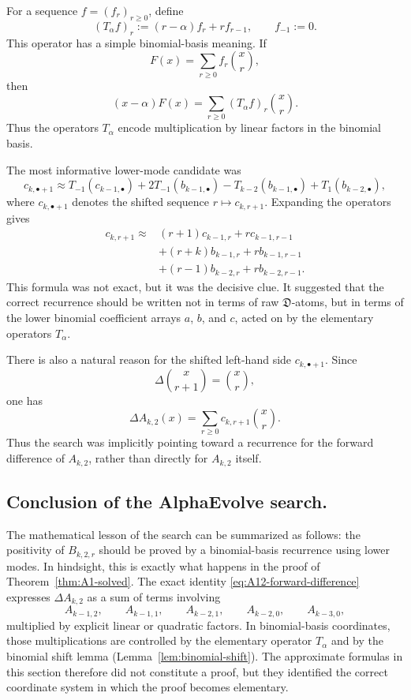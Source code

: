 \documentclass[11pt]{amsart}
\numberwithin{equation}{section}
\theoremstyle{remark}
\newcommand{\Dder}{\mathfrak D}
\begin{document}
For a sequence $f=(f_r)_{r\ge0}$, define
\[
  (T_\alpha f)_r:=(r-\alpha)f_r+r f_{r-1},
  \qquad f_{-1}:=0.
\]
This operator has a simple binomial-basis meaning.  If
\[
  F(x)=\sum_{r\ge0}f_r\binom{x}{r},
\]
then
\[
  (x-\alpha)F(x)
  =
  \sum_{r\ge0}(T_\alpha f)_r\binom{x}{r}.
\]
Thus the operators $T_\alpha$ encode multiplication by linear factors in
the binomial basis.

The most informative lower-mode candidate was
\begin{equation}\label{eq:operator-library-merged}
  c_{k,\bullet+1}
  \approx
  T_{-1}(c_{k-1,\bullet})
  +2T_{-1}(b_{k-1,\bullet})
  -T_{k-2}(b_{k-1,\bullet})
  +T_1(b_{k-2,\bullet}),
\end{equation}
where $c_{k,\bullet+1}$ denotes the shifted sequence
$r\mapsto c_{k,r+1}$.  Expanding the operators gives
\begin{equation}\label{eq:operator-library-expanded-merged}
\begin{aligned}
c_{k,r+1}\approx{}&
(r+1)c_{k-1,r}
+r c_{k-1,r-1}  \\
&+(r+k)b_{k-1,r}
+r b_{k-1,r-1}  \\
&+(r-1)b_{k-2,r}
+r b_{k-2,r-1}.
\end{aligned}
\end{equation}
This formula was not exact, but it was the decisive clue.  It suggested
that the correct recurrence should be written not in terms of raw
$\Dder$-atoms, but in terms of the lower binomial coefficient arrays
$a$, $b$, and $c$, acted on by the elementary operators $T_\alpha$.

There is also a natural reason for the shifted left-hand side
$c_{k,\bullet+1}$.  Since
\[
  \Delta\binom{x}{r+1}=\binom{x}{r},
\]
one has
\[
  \Delta A_{k,2}(x)
  =
  \sum_{r\ge0} c_{k,r+1}\binom{x}{r}.
\]
Thus the search was implicitly pointing toward a recurrence for the forward
difference of $A_{k,2}$, rather than directly for $A_{k,2}$ itself.

\subsection{Conclusion of the AlphaEvolve search.}
The mathematical lesson of the search can be summarized as follows: the positivity of $B_{k,2,r}$ should be proved by a binomial-basis recurrence using lower modes.
In hindsight, this is exactly what happens in the proof of Theorem~\ref{thm:A1-solved}.  The exact identity
\eqref{eq:A12-forward-difference} expresses $\Delta A_{k,2}$ as a sum of
terms involving
\[
  A_{k-1,2},\qquad
  A_{k-1,1},\qquad
  A_{k-2,1},\qquad
  A_{k-2,0},\qquad
  A_{k-3,0},
\]
multiplied by explicit linear or quadratic factors.  In binomial-basis
coordinates, those multiplications are controlled by the elementary
operator $T_\alpha$ and by the binomial shift lemma
(Lemma~\ref{lem:binomial-shift}).  The approximate formulas in this section
therefore did not constitute a proof, but they identified the correct
coordinate system in which the proof becomes elementary.
\end{document}
